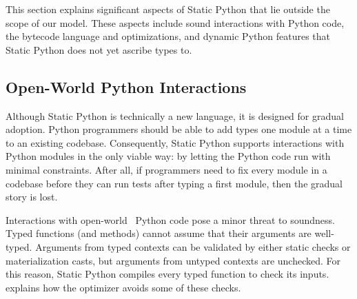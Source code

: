 \documentclass[english,cleveref,submission]{programming}
\newcommand{\SP}{Static Python}
\begin{document}



This section explains significant aspects of \SP{} that lie outside the
scope of our model.
These aspects include sound interactions with Python code,
the bytecode language and optimizations, and dynamic Python features
that \SP{} does not yet ascribe types to.


\subsection{Open-World Python Interactions}

Although \SP{} is technically a new language, it is designed for gradual adoption.
Python programmers should be able to add types one module at a time to an
existing codebase.
Consequently, \SP{} supports interactions with Python modules in the only viable
way: by letting the Python code run with minimal constraints.
After all, if programmers need to fix every module in a codebase before they can
run tests after typing a first module, then the gradual story is lost.

Interactions with open-world~\cite{vss-popl-2017} Python code pose a minor
threat to soundness.
Typed functions (and methods) cannot assume that their arguments are
well-typed.
Arguments from typed contexts can be validated by either static checks
or materialization casts, but arguments from untyped contexts are unchecked.
For this reason, \SP{} compiles every typed function to check its inputs.
 explains how the optimizer avoids some of these checks.
\end{document}
